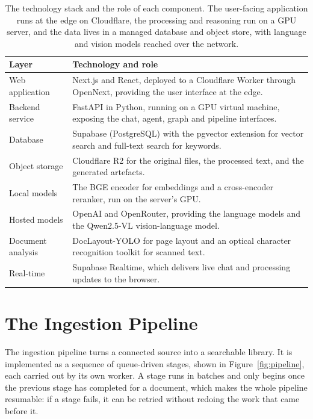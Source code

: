 \begin{table}[H]
  \centering
  \caption{The technology stack and the role of each component. The user-facing
  application runs at the edge on Cloudflare, the processing and reasoning run on a
  GPU server, and the data lives in a managed database and object store, with
  language and vision models reached over the network.}
  \label{tab:stack}
  \small
  \begin{tabularx}{\textwidth}{@{}p{}X@{}}
    \toprule
    \textbf{Layer} & \textbf{Technology and role} \\
    \midrule
    Web application      & Next.js and React, deployed to a Cloudflare Worker through OpenNext, providing the user interface at the edge. \\
    Backend service      & FastAPI in Python, running on a GPU virtual machine, exposing the chat, agent, graph and pipeline interfaces. \\
    Database             & Supabase (PostgreSQL) with the pgvector extension for vector search and full-text search for keywords. \\
    Object storage       & Cloudflare R2 for the original files, the processed text, and the generated artefacts. \\
    Local models         & The BGE encoder for embeddings and a cross-encoder reranker, run on the server's GPU. \\
    Hosted models        & OpenAI and OpenRouter, providing the language models and the Qwen2.5-VL vision-language model. \\
    Document analysis    & DocLayout-YOLO for page layout and an optical character recognition toolkit for scanned text. \\
    Real-time            & Supabase Realtime, which delivers live chat and processing updates to the browser. \\
    \bottomrule
  \end{tabularx}
\end{table}

\section{The Ingestion Pipeline}

The ingestion pipeline turns a connected source into a searchable library. It is
implemented as a sequence of queue-driven stages, shown in
Figure~\ref{fig:pipeline}, each carried out by its own worker. A stage runs in
batches and only begins once the previous stage has completed for a document,
which makes the whole pipeline resumable: if a stage fails, it can be retried
without redoing the work that came before it.

